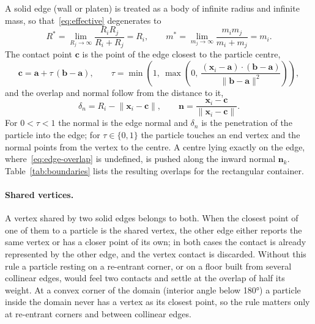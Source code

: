 A solid edge (wall or platen) is treated as a body of infinite radius and
infinite mass, so that~\eqref{eq:effective} degenerates to
\begin{equation}
  R^{*} = \lim_{R_{j}\to\infty} \frac{R_{i}R_{j}}{R_{i}+R_{j}} = R_{i},
  \qquad
  m^{*} = \lim_{m_{j}\to\infty} \frac{m_{i}m_{j}}{m_{i}+m_{j}} = m_{i}.
  \label{eq:wall-effective}
\end{equation}
The contact point $\mathbf{c}$ is the point of the edge closest to the particle
centre,
\begin{equation}
  \mathbf{c} = \mathbf{a} + \tau\,(\mathbf{b}-\mathbf{a}),
  \qquad
  \tau = \min\!\left(1,\ \max\!\left(0,\
         \frac{(\mathbf{x}_{i}-\mathbf{a})\cdot(\mathbf{b}-\mathbf{a})}
              {\lVert\mathbf{b}-\mathbf{a}\rVert^{2}}\right)\right),
  \label{eq:closest-point}
\end{equation}
and the overlap and normal follow from the distance to it,
\begin{equation}
  \delta_{n} = R_{i} - \lVert\mathbf{x}_{i}-\mathbf{c}\rVert,
  \qquad
  \mathbf{n} = \frac{\mathbf{x}_{i}-\mathbf{c}}
                    {\lVert\mathbf{x}_{i}-\mathbf{c}\rVert}.
  \label{eq:edge-overlap}
\end{equation}
For $0<\tau<1$ the normal is the edge normal and $\delta_{n}$ is the penetration
of the particle into the edge; for $\tau\in\{0,1\}$ the particle touches an end
vertex and the normal points from the vertex to the centre.  A centre lying
exactly on the edge, where~\eqref{eq:edge-overlap} is undefined, is pushed along
the inward normal $\mathbf{n}_{k}$.  Table~\ref{tab:boundaries} lists the
resulting overlaps for the rectangular container.

\paragraph{Shared vertices.}  A vertex shared by two solid edges belongs to
both.  When the closest point of one of them to a particle is the shared vertex,
the other edge either reports the same vertex or has a closer point of its own;
in both cases the contact is already represented by the other edge, and the
vertex contact is discarded.  Without this rule a particle resting on a
re-entrant corner, or on a floor built from several collinear edges, would feel
two contacts and settle at the overlap of half its weight.  At a convex corner
of the domain (interior angle below \ang{180}) a particle inside the domain
never has a vertex as its closest point, so the rule matters only at re-entrant
corners and between collinear edges.


